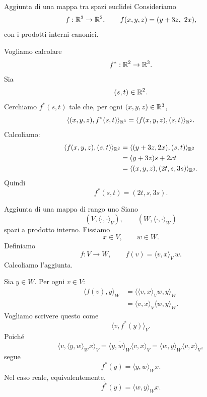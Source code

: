 \documentclass[a4paper]{article}
\begin{document}
\begin{snippetexample}{Aggiunta di una mappa tra spazi euclidei}
    Consideriamo
    \[
        f:\mathbb{R}^3\to\mathbb{R}^2,
        \qquad
        f(x,y,z)=(y+3z,\ 2x),
    \]
    con i prodotti interni canonici.

    Vogliamo calcolare
    \[
        f^*:\mathbb{R}^2\to\mathbb{R}^3.
    \]
    Sia
    \[
        (s,t)\in\mathbb{R}^2.
    \]
    Cerchiamo \(f^*(s,t)\) tale che, per ogni \((x,y,z)\in\mathbb{R}^3\),
    \[
        \langle (x,y,z),f^*(s,t)\rangle_{\mathbb{R}^3}
        =
        \langle f(x,y,z),(s,t)\rangle_{\mathbb{R}^2}.
    \]
    Calcoliamo:
    \begin{align*}
        \langle f(x,y,z),(s,t)\rangle_{\mathbb{R}^2}
        &=
        \langle (y+3z,2x),(s,t)\rangle_{\mathbb{R}^2}\\
        &=
        (y+3z)s+2xt\\
        &=
        \langle (x,y,z),(2t,s,3s)\rangle_{\mathbb{R}^3}.
    \end{align*}
    Quindi
    \[
        f^*(s,t)=(2t,s,3s).
    \]
\end{snippetexample}

\begin{snippetexample}{Aggiunta di una mappa di rango uno}
    Siano
    \[
        (V,\langle\cdot,\cdot\rangle_V),
        \qquad
        (W,\langle\cdot,\cdot\rangle_W)
    \]
    spazi a prodotto interno. Fissiamo
    \[
        x\in V,
        \qquad
        w\in W.
    \]
    Definiamo
    \[
        f:V\to W,
        \qquad
        f(v)=\langle v,x\rangle_V\,w.
    \]
    Calcoliamo l'aggiunta.

    Sia \(y\in W\). Per ogni \(v\in V\):
    \begin{align*}
        \langle f(v),y\rangle_W
        &=
        \langle \langle v,x\rangle_V w,y\rangle_W\\
        &=
        \langle v,x\rangle_V\langle w,y\rangle_W.
    \end{align*}
    Vogliamo scrivere questo come
    \[
        \langle v,f^*(y)\rangle_V.
    \]
    Poiché
    \[
        \langle v,\langle y,w\rangle_W x\rangle_V
        =
        \overline{\langle y,w\rangle_W}\langle v,x\rangle_V
        =
        \langle w,y\rangle_W\langle v,x\rangle_V,
    \]
    segue
    \[
        f^*(y)=\langle y,w\rangle_W x.
    \]
    Nel caso reale, equivalentemente,
    \[
        f^*(y)=\langle w,y\rangle_W x.
    \]
\end{snippetexample}
\end{document}
